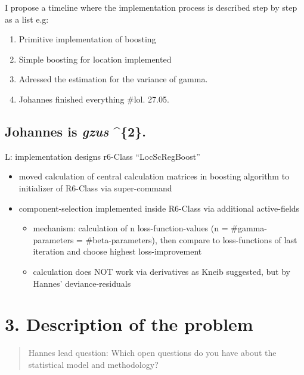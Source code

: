 \documentclass[
]{report}
\providecommand{\tightlist}{%
  \setlength{\itemsep}{0pt}\setlength{\parskip}{0pt}}
\begin{document}
I propose a timeline where the implementation process is described step
by step as a list e.g:

\begin{enumerate}
\def\labelenumi{\arabic{enumi}.}
\tightlist
\item
  Primitive implementation of boosting
\item
  Simple boosting for location implemented
\item
  Adressed the estimation for the variance of gamma.
\item
  Johannes finished everything \#lol. 27.05.
\end{enumerate}

\hypertarget{johannes-is-gzus-2.}{%
\section{\texorpdfstring{Johannes is \emph{gzus}
\^{}\{2\}.}{Johannes is gzus \^{}\{2\}.}}\label{johannes-is-gzus-2.}}

L: implementation designs r6-Class ``LocScRegBoost''

\begin{itemize}
\tightlist
\item
  moved calculation of central calculation matrices in boosting
  algorithm to initializer of R6-Class via super-command
\item
  component-selection implemented inside R6-Class via additional
  active-fields

  \begin{itemize}
  \tightlist
  \item
    mechanism: calculation of n loss-function-values (n =
    \#gamma-parameters = \#beta-parameters), then compare to
    loss-functions of last iteration and choose highest loss-improvement
  \item
    calculation does NOT work via derivatives as Kneib suggested, but by
    Hannes' deviance-residuals
  \end{itemize}
\end{itemize}

\hypertarget{description-of-the-problem}{%
\chapter{3. Description of the
problem}\label{description-of-the-problem}}

\begin{quote}
Hannes lead question: Which open questions do you have about the
statistical model and methodology?
\end{quote}
\end{document}
